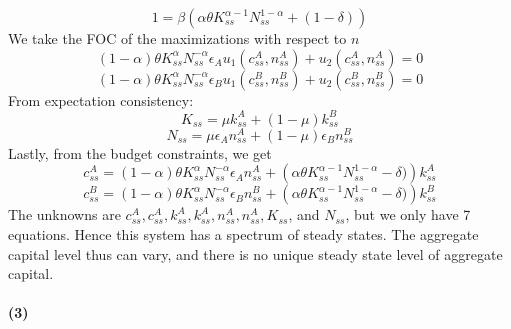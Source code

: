 \documentclass[10pt,letter]{article}
\newcommand{\problempart}[1]{\paragraph{#1}}
\begin{document}
\[ 1 = \beta \left( \alpha \theta K_{ss}^{\alpha-1}N_{ss}^{1-\alpha} + (1-\delta)\right) \]
We take the FOC of the maximizations with respect to $n$
\[ (1-\alpha)\theta K_{ss}^\alpha N_{ss}^{-\alpha}\epsilon_Au_1(c^A_{ss}, n^A_{ss})  + u_2(c^A_{ss}, n^A_{ss}) = 0 \]
\[ (1-\alpha)\theta K_{ss}^\alpha N_{ss}^{-\alpha}\epsilon_Bu_1(c^B_{ss}, n^B_{ss})  + u_2(c^B_{ss}, n^B_{ss}) = 0 \]
From expectation consistency:
\[ K_{ss} = \mu k^A_{ss} + (1-\mu) k^B_{ss} \]
\[ N_{ss} = \mu \epsilon_A n^A_{ss} + (1-\mu) \epsilon_B n^B_{ss} \]
Lastly, from the budget constraints, we get
\[ c^A_{ss} =  (1-\alpha)\theta K_{ss}^\alpha N_{ss}^{-\alpha} \epsilon_A n^A_{ss} + \left( \alpha \theta K_{ss}^{\alpha-1}N_{ss}^{1-\alpha} -\delta)\right) k^A_{ss} \]
\[ c^B_{ss} =  (1-\alpha)\theta K_{ss}^\alpha N_{ss}^{-\alpha} \epsilon_B n^B_{ss} + \left( \alpha \theta K_{ss}^{\alpha-1}N_{ss}^{1-\alpha} -\delta)\right) k^B_{ss} \]
The unknowns are $c^A_{ss}, c^A_{ss}, k^A_{ss}, k^A_{ss}, n^A_{ss}, n^A_{ss}, K_{ss}$, and $N_{ss}$, but we only have 7 equations. Hence this system has a spectrum of steady states. The aggregate capital level thus can vary, and there is no unique steady state level of aggregate capital.
\problempart{(3)}
\end{document}
